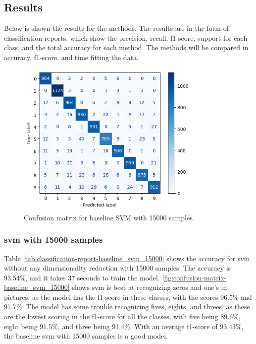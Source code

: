 \subsection{Results}\label{subsec:experiment-1-results}
Below is shown the results for the methods. The results are in the form of classification reports, which show the precision, recall, f1-score, support for each class, and the total accuracy for each method. The methods will be compared in accuracy, f1-score, and time fitting the data. 

\begin{figure}[htb!]
    \centering
    \includegraphics[width=0.8\textwidth]{figures/1-experiment/confusion_matrix_baseline_svm_15000.png}
    \caption{Confusion matrix for baseline SVM with 15000 samples.}
    \label{fig:confusion-matrix-baseline_svm_15000}
\end{figure}
\subsubsection{\gls{svm} with 15000 samples}\label{subsubsec:experiment-1-results-svm-15000}
Table \ref{tab:classification-report-baseline_svm_15000} shows the accuracy for \gls{svm} without any dimensionality reduction with 15000 samples. The accuracy is 93.54\%, and it takes 37 seconds to train the model. \autoref{fig:confusion-matrix-baseline_svm_15000} shows \gls{svm} is best at recognizing zeros and one's in pictures, as the model has the f1-score in these classes, with the scores 96.5\% and 97.7\%. The model has some trouble recognizing fives, eights, and threes, as these are the lowest scoring in the f1-score for all the classes, with five being 89.6\%, eight being 91.5\%, and three being 91.4\%. With an average f1-score of 93.43\%, the baseline \gls{svm} with 15000 samples is a good model. 


